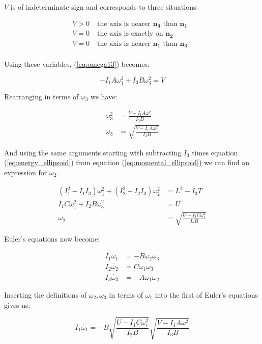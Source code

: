 \documentclass[a4paper, 12pt]{article}
\begin{document}
$V$ is of indeterminate sign and corresponds to three situations:

\begin{align}
  V > 0 & \;\textrm{the axis is nearer $\bm{n_3}$ than  $\bm{n_1}$ }\\
  V = 0 & \;\textrm{the axis is exactly on $\bm{n_2}$} \\
  V = 0 & \;\textrm{the axis is nearer $\bm{n_1}$ than  $\bm{n_3}$} \\
\end{align}

Using these variables, (\ref{eq:omega13}) becomes:

\begin{equation}
  -I_1A\omega_1^2 + I_3B\omega_3^2 = V \label{eq:omega13s}
\end{equation}

Rearranging in terms of $\omega_3$ we have:

\begin{align}
  \omega_3^2 &=\frac{V-I_1A\omega^2}{I_3B} \\
  \omega_3 &=\sqrt{\frac{V-I_1A\omega^2}{I_3B}}
\end{align}

And using the same arguments starting with subtracting $I_3$ times equation (\ref{eq:energy_ellipsoid}) from equation (\ref{eq:momental_ellipsoid}) we can find an expression for $\omega_2$.

\begin{align}
  (I_1^2 - I_1I_3)\omega_1^2 + (I_2^2-I_2I_3)\omega_2^2 &= L^2 - I_3T \\
  I_1C\omega_1^2 + I_2B\omega_3^2 &= U \\
  \omega_2 &=\sqrt{\frac{U - I_1C\omega_1^2}{I_2B}}
\end{align}

Euler's equations now become:

\begin{align}
  I_1\dot{\omega_1}& = -B\omega_2\omega_3 \label{eq:euler1} \\
  I_2\dot{\omega_2}& = C\omega_1\omega_3 \\
  I_3\dot{\omega_3}& = -A\omega_1\omega_2 
\end{align}

Inserting the definitions of $\omega_2, \omega_3$ in terms of $\omega_1$ into the first of Euler's equations gives us:

\begin{equation}
  I_1\dot{\omega_1} = -B\sqrt{\frac{U-I_1C\omega_1^2}{I_2B}}\sqrt{\frac{V-I_1A\omega^2}{I_3B}}
\end{equation}
\end{document}
